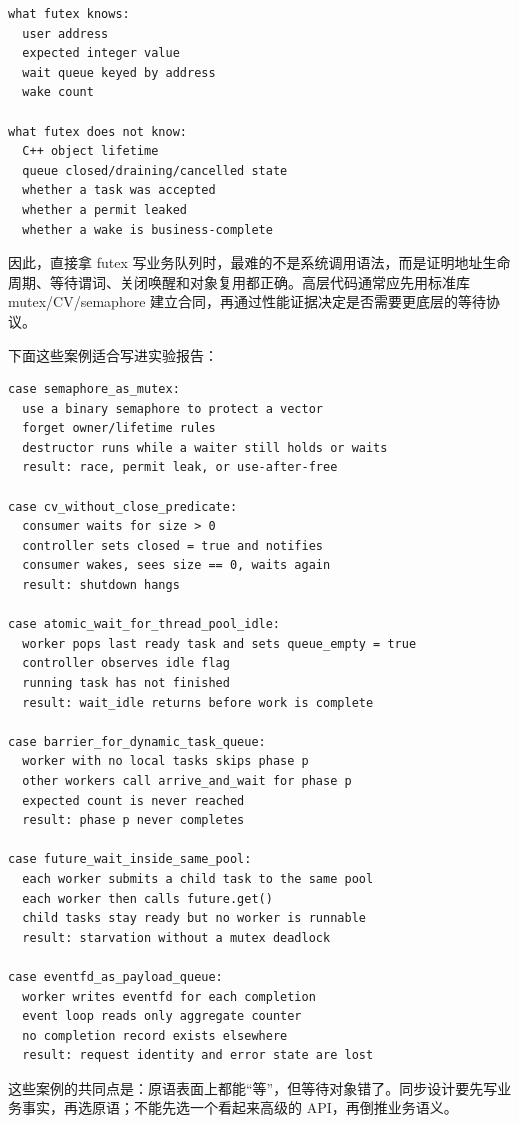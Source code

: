 \begin{lstlisting}[numbers=none,caption={futex 语义边界}]
what futex knows:
  user address
  expected integer value
  wait queue keyed by address
  wake count

what futex does not know:
  C++ object lifetime
  queue closed/draining/cancelled state
  whether a task was accepted
  whether a permit leaked
  whether a wake is business-complete
\end{lstlisting}

因此，直接拿 futex 写业务队列时，最难的不是系统调用语法，而是证明地址生命周期、等待谓词、关闭唤醒和对象复用都正确。高层代码通常应先用标准库 mutex/CV/semaphore 建立合同，再通过性能证据决定是否需要更底层的等待协议。

下面这些案例适合写进实验报告：

\begin{lstlisting}[numbers=none,caption={同步原语错误选择案例}]
case semaphore_as_mutex:
  use a binary semaphore to protect a vector
  forget owner/lifetime rules
  destructor runs while a waiter still holds or waits
  result: race, permit leak, or use-after-free

case cv_without_close_predicate:
  consumer waits for size > 0
  controller sets closed = true and notifies
  consumer wakes, sees size == 0, waits again
  result: shutdown hangs

case atomic_wait_for_thread_pool_idle:
  worker pops last ready task and sets queue_empty = true
  controller observes idle flag
  running task has not finished
  result: wait_idle returns before work is complete

case barrier_for_dynamic_task_queue:
  worker with no local tasks skips phase p
  other workers call arrive_and_wait for phase p
  expected count is never reached
  result: phase p never completes

case future_wait_inside_same_pool:
  each worker submits a child task to the same pool
  each worker then calls future.get()
  child tasks stay ready but no worker is runnable
  result: starvation without a mutex deadlock

case eventfd_as_payload_queue:
  worker writes eventfd for each completion
  event loop reads only aggregate counter
  no completion record exists elsewhere
  result: request identity and error state are lost
\end{lstlisting}

这些案例的共同点是：原语表面上都能“等”，但等待对象错了。同步设计要先写业务事实，再选原语；不能先选一个看起来高级的 API，再倒推业务语义。

